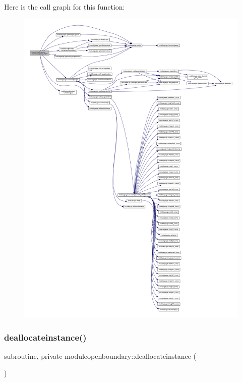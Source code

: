 Here is the call graph for this function\+:\nopagebreak
\begin{figure}[H]
\begin{center}
\leavevmode
\includegraphics[width=350pt]{namespacemoduleopenboundary_a4de0cd486a833b86ff9e035de046ff81_cgraph}
\end{center}
\end{figure}
\mbox{\label{namespacemoduleopenboundary_a6b40de889bc24c11e911ca6efb54e645}} 
\subsubsection{\texorpdfstring{deallocateinstance()}{deallocateinstance()}}
{\footnotesize\ttfamily subroutine, private moduleopenboundary\+::deallocateinstance (\begin{DoxyParamCaption}{ }\end{DoxyParamCaption})\hspace{0.3cm}{\ttfamily [private]}}

